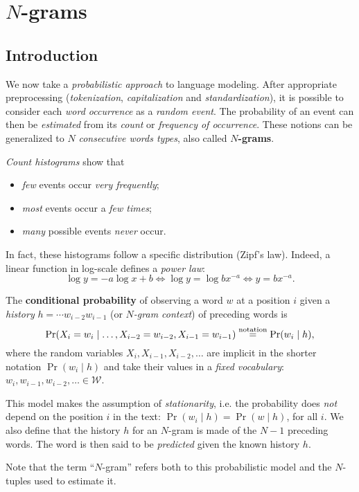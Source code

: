 \section{\(N\)-grams}
\subsection{Introduction}
We now take a \emph{probabilistic approach} to language modeling.
After appropriate preprocessing (\emph{tokenization}, \emph{capitalization} and \emph{standardization}), it is possible to consider each \emph{word occurrence} as a \emph{random event}.
The probability of an event can then be \emph{estimated} from its \emph{count} or \emph{frequency of occurrence}.
These notions can be generalized to \(N\) \emph{consecutive words types}, also called \textbf{\(N\)-grams}.

\emph{Count histograms} show that
\begin{itemize}
	\item \emph{few} events occur \emph{very frequently};
	\item \emph{most} events occur a \emph{few times};
	\item \emph{many} possible events \emph{never} occur.
\end{itemize}
In fact, these histograms follow a specific distribution (Zipf's law).
Indeed, a linear function in log-scale defines a \emph{power law}:
\[
\log y = -a \log x + b \iff \log y = \log bx^{-a} \iff y = bx^{-a}.
\]

\begin{mydef}
	The \textbf{conditional probability} of observing a word \(w\) at a position \(i\) given a \emph{history} \(h = \cdots w_{i-2} w_{i-1}\) (or \emph{\(N\)-gram context}) of preceding words is
	\[
	\Pr(X_i = w_i \mid \dots, X_{i-2} = w_{i-2}, X_{i-1} = w_{i-1}) \overset{\textnormal{notation}}{=} \Pr(w_i \mid h),
	\]
	where the random variables \(X_i, X_{i-1}, X_{i-2}, \dots\) are implicit in the shorter notation \(\Pr(w_i \mid h)\) and take their values in a \emph{fixed vocabulary}: \(w_i, w_{i-1}, w_{i-2}, \ldots \in \mathcal{W}\).
	
	This model makes the assumption of \emph{stationarity}, i.e. the probability does \emph{not} depend on the position \(i\) in the text: \(\Pr(w_i \mid h) = \Pr(w \mid h)\), for all \(i\).
	We also define that the history \(h\) for an \(N\)-gram is made of the \(N-1\) preceding words.
	The word is then said to be \emph{predicted} given the known history \(h\).
\end{mydef}
Note that the term ``\(N\)-gram'' refers both to this probabilistic model and the \(N\)-tuples used to estimate it.

